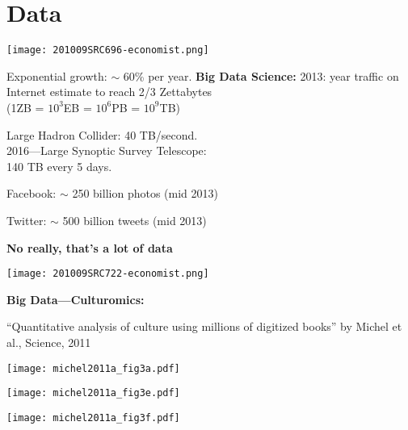 \section{Data}

  
  
  \begin{marginfigure}[]
    \texttt{[image: 201009SRC696-economist.png]}
  \end{marginfigure}

      Exponential growth: $\sim$ 60\% per year.
    \textbf{Big Data Science:}
      2013: year traffic on Internet estimate to reach 2/3 Zettabytes \\
      (1ZB = $10^3$EB = $10^6$PB = $10^9$TB)
     
      Large Hadron Collider: 40 TB/second.\\
     
      2016---Large Synoptic Survey Telescope:\\
      140 TB every 5 days.
     
      Facebook: $\sim$ 250 billion photos (mid 2013)
     
      Twitter: $\sim$ 500 billion tweets (mid 2013)
  
      \textbf{No really, that's a lot of data}

  \begin{marginfigure}[]
\texttt{[image: 201009SRC722-economist.png]}
\end{marginfigure}

  \textbf{Big Data---Culturomics:}

  \small{``Quantitative analysis of culture using millions of
    digitized books'' by Michel et al., Science, 2011\cite{michel2011a}}

  \begin{marginfigure}[]
\texttt{[image: michel2011a\_fig3a.pdf]} 
\end{marginfigure}

  \begin{marginfigure}[]
\texttt{[image: michel2011a\_fig3e.pdf]} 
\end{marginfigure}

  \begin{marginfigure}[]
\texttt{[image: michel2011a\_fig3f.pdf]}
\end{marginfigure}

